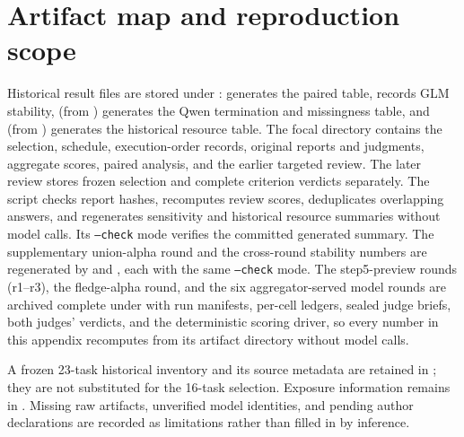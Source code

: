 \documentclass[11pt]{article}
\begin{document}
\section{Artifact map and reproduction scope}
Historical result files are stored under :  generates the paired table,  records GLM stability,  (from ) generates the Qwen termination and missingness table, and  (from ) generates the historical resource table. The focal directory contains the selection, schedule, execution-order records, original reports and judgments, aggregate scores, paired analysis, and the earlier targeted review. The later review stores frozen selection and complete criterion verdicts separately. The script  checks report hashes, recomputes review scores, deduplicates overlapping answers, and regenerates sensitivity and historical resource summaries without model calls. Its \texttt{--check} mode verifies the committed generated summary. The supplementary union-alpha round and the cross-round stability numbers are regenerated by  and , each with the same \texttt{--check} mode. The step5-preview rounds (r1--r3), the fledge-alpha round, and the six aggregator-served model rounds are archived complete under  with run manifests, per-cell ledgers, sealed judge briefs, both judges' verdicts, and the deterministic scoring driver, so every number in this appendix recomputes from its artifact directory without model calls.

A frozen 23-task historical inventory and its source metadata are retained in ; they are not substituted for the 16-task selection. Exposure information remains in . Missing raw artifacts, unverified model identities, and pending author declarations are recorded as limitations rather than filled in by inference.
\end{document}
